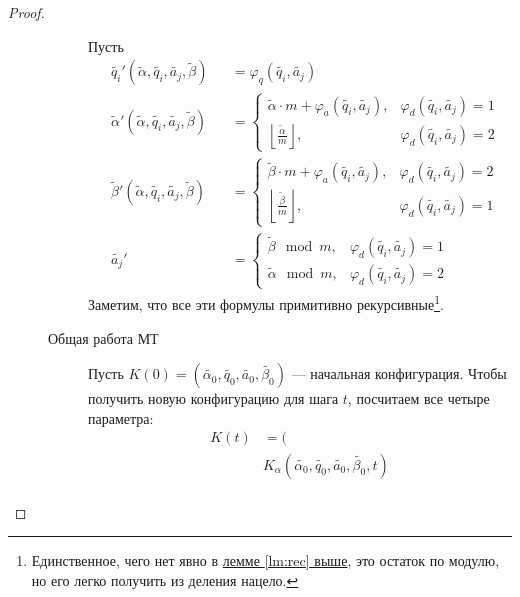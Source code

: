 \begin{proof}
\begin{description}
\begin{description}
			Пусть 
			\[
			\begin{aligned}
				&\widetilde{ q_i}'  (\widetilde{ \alpha } , \widetilde{ q_i}, \widetilde{ a_j} , \widetilde{ \beta } ) &&= \varphi_{q}(\widetilde{ q_i} , \widetilde{ a_j} ) \\
				&\widetilde{ \alpha } ' (\widetilde{ \alpha } , \widetilde{ q_i} , \widetilde{ a_j} , \widetilde{ \beta } ) &&= 
				\begin{cases}
					\widetilde{ \alpha } \cdot m + \varphi_{a}(\widetilde{ q_i} , \widetilde {a_j}), & \varphi _{d}(\widetilde{ q_i} ,\widetilde{ a_j} ) = 1 \\
					\left\lfloor \frac{\widetilde{ \alpha } }{m} \right\rfloor, & \varphi _{d}(\widetilde {q_i},\widetilde {a_j}) = 2
				\end{cases}
					\\
				&\widetilde{ \beta } ' (\widetilde{ \alpha } , \widetilde {q_i}, \widetilde {a_j}, \widetilde{ \beta } ) &&= 
				\begin{cases}
					\widetilde{ \beta } \cdot m + \varphi_{a}(\widetilde {q_i}, \widetilde {a_j}), & \varphi _{d}(\widetilde {q_i} ,\widetilde {a_j} ) = 2 \\
					\left\lfloor \frac{\widetilde{ \beta } }{m} \right\rfloor, & \varphi _{d}(\widetilde {q_i},\widetilde {a_j} ) = 1
				\end{cases}
		\\
				& \widetilde {a_j} ' &&= 
		\begin{cases}
			\widetilde{ \beta }  \mod m, & \varphi _{d}(\widetilde {q_i} ,\widetilde {a_j} ) = 1 \\
			\widetilde{ \alpha  }  \mod m, & \varphi _{d}(\widetilde{ q_i} ,\widetilde {a_j} ) = 2 
		\end{cases}
			\end{aligned}
	\]
	Заметим, что все эти формулы примитивно рекурсивные\footnote{Единственное, чего нет явно в \hyperref[lm:rec]{лемме \ref{lm:rec} выше}, это остаток по модулю, но его легко получить из деления нацело.}.
\item[Общая работа МТ]
	Пусть $ K(0) = \left( \widetilde{ \alpha _0} , \widetilde{ q_0}, \widetilde{ a_0} , \widetilde{ \beta _0} \right) $ --- начальная конфигурация.
	Чтобы получить новую конфигурацию для шага $ t$, посчитаем все четыре параметра:
	\[
	\begin{aligned}
		K(t) &= ( \\
			 &K_{ \alpha }(\widetilde{ \alpha_0} , \widetilde{ q_0} , \widetilde{ a_0}, \widetilde{ \beta_0}, t) \\ 

\end{aligned}\]
\end{description}
\end{description}
\end{proof}
